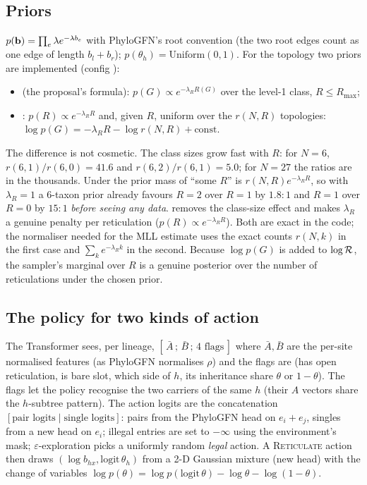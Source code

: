 \subsection{Priors}
$p(\mathbf{b})=\prod_e\lambda e^{-\lambda b_e}$ with PhyloGFN's root convention (the two root edges count as one edge of length $b_l+b_r$); $p(\theta_h)=\mathrm{Uniform}(0,1)$. For the topology two priors are implemented (config ):
\begin{itemize}[nosep]
\item {} (the proposal's formula): $p(G)\propto e^{-\lambda_RR(G)}$ over the level-1 class, $R\le R_{\max}$;
\item {}: $p(R)\propto e^{-\lambda_RR}$ and, given $R$, uniform over the $r(N,R)$ topologies: $\log p(G)=-\lambda_RR-\log r(N,R)+\text{const}$.
\end{itemize}
The difference is not cosmetic. The class sizes grow fast with $R$: for $N=6$, $r(6,1)/r(6,0)=41.6$ and $r(6,2)/r(6,1)=5.0$; for $N=27$ the ratios are in the thousands. Under  the prior mass of ``some $R$'' is $r(N,R)e^{-\lambda_RR}$, so with $\lambda_R=1$ a 6-taxon prior already favours $R=2$ over $R=1$ by $1.8:1$ and $R=1$ over $R=0$ by $15:1$ \emph{before seeing any data}.  removes the class-size effect and makes $\lambda_R$ a genuine penalty per reticulation ($p(R)\propto e^{-\lambda_R R}$). Both are exact in the code; the normaliser needed for the MLL estimate uses the exact counts $r(N,k)$ in the first case and $\sum_k e^{-\lambda_Rk}$ in the second. Because $\log p(G)$ is added to $\log\mathcal{R}$, the sampler's marginal over $R$ is a genuine posterior over the number of reticulations under the chosen prior.

\subsection{The policy for two kinds of action}
The Transformer sees, per lineage, $[\,\bar A\,;\,\bar B\,;\,\text{4 flags}\,]$ where $\bar A,\bar B$ are the per-site normalised features (as PhyloGFN normalises $\rho$) and the flags are (has open reticulation, is bare slot, which side of $h$, its inheritance share $\theta$ or $1-\theta$). The flags let the policy recognise the two carriers of the same $h$ (their $A$ vectors share the $h$-subtree pattern). The action logits are the concatenation $[\text{pair logits}\mid\text{single logits}]$: pairs from the PhyloGFN head on $e_i+e_j$, singles from a new head on $e_i$; illegal entries are set to $-\infty$ using the environment's mask; $\varepsilon$-exploration picks a uniformly random \emph{legal} action. A \textsc{Reticulate} action then draws $(\log b_{hx},\mathrm{logit}\,\theta_h)$ from a 2-D Gaussian mixture (new head) with the change of variables $\log p(\theta)=\log p(\mathrm{logit}\,\theta)-\log\theta-\log(1-\theta)$.

